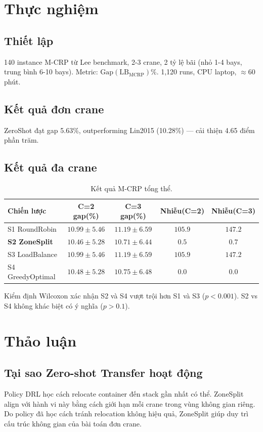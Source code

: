 \documentclass[11pt,a4paper]{elsarticle}
\newcommand{\LB}{\text{LB}}
\begin{document}
\section{Thực nghiệm}

\subsection{Thiết lập}
140 instance M-CRP từ Lee benchmark, 2-3 crane, 2 tỷ lệ bãi (nhỏ 1-4 bays, trung bình 6-10 bays). Metric: $\text{Gap}(\LB_{\text{MCRP}})\%$. 1,120 runs, CPU laptop, $\approx$60 phút.

\subsection{Kết quả đơn crane}
ZeroShot đạt gap 5.63\%, outperforming Lin2015 (10.28\%) — cải thiện 4.65 điểm phần trăm.

\subsection{Kết quả đa crane}
\begin{table}[h!]
    \centering
    \caption{Kết quả M-CRP tổng thể.}
    \label{tab:mc_vi}
    \begin{tabularx}{\textwidth}{lcccc}
        \toprule
        Chiến lược & C=2 gap(\%) & C=3 gap(\%) & Nhiễu(C=2) & Nhiễu(C=3) \\
        \midrule
        S1 RoundRobin & $10.99 \pm 5.46$ & $11.19 \pm 6.59$ & $105.9$ & $147.2$ \\
        \textbf{S2 ZoneSplit} & $\mathbf{10.46 \pm 5.28}$ & $\mathbf{10.71 \pm 6.44}$ & $\mathbf{0.5}$ & $\mathbf{0.7}$ \\
        S3 LoadBalance & $10.99 \pm 5.46$ & $11.19 \pm 6.59$ & $105.9$ & $147.2$ \\
        S4 GreedyOptimal & $10.48 \pm 5.28$ & $10.75 \pm 6.48$ & $0.0$ & $0.0$ \\
        \bottomrule
    \end{tabularx}
\end{table}

Kiểm định Wilcoxon xác nhận S2 và S4 vượt trội hơn S1 và S3 ($p<0.001$). S2 vs S4 không khác biệt có ý nghĩa ($p>0.1$).

\section{Thảo luận}

\subsection{Tại sao Zero-shot Transfer hoạt động}
Policy DRL học cách relocate container đến stack gần nhất có thể. ZoneSplit align với hành vi này bằng cách giới hạn mỗi crane trong vùng không gian riêng. Do policy đã học cách tránh relocation không hiệu quả, ZoneSplit giúp duy trì cấu trúc không gian của bài toán đơn crane.
\end{document}
